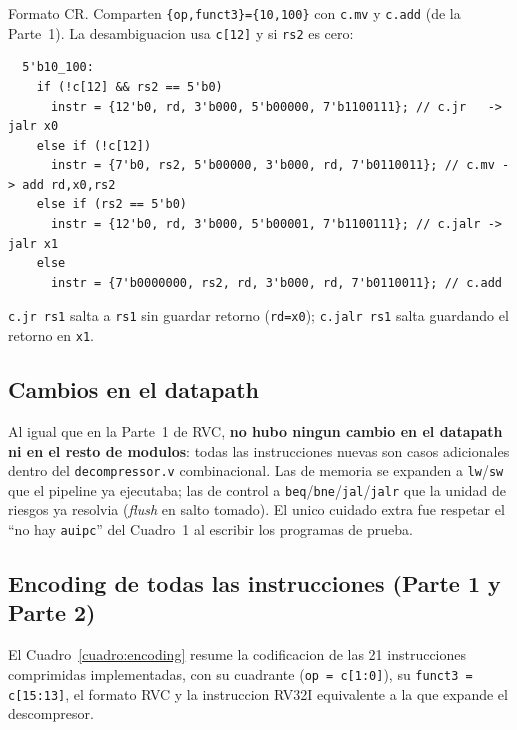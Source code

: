 \documentclass[11pt,a4paper]{article}
\begin{document}
Formato CR. Comparten \texttt{\{op,funct3\}=\{10,100\}} con \texttt{c.mv} y
\texttt{c.add} (de la Parte~1). La desambiguacion usa \texttt{c[12]} y si
\texttt{rs2} es cero:

\begin{lstlisting}
  5'b10_100:
    if (!c[12] && rs2 == 5'b0)
      instr = {12'b0, rd, 3'b000, 5'b00000, 7'b1100111}; // c.jr   -> jalr x0
    else if (!c[12])
      instr = {7'b0, rs2, 5'b00000, 3'b000, rd, 7'b0110011}; // c.mv -> add rd,x0,rs2
    else if (rs2 == 5'b0)
      instr = {12'b0, rd, 3'b000, 5'b00001, 7'b1100111}; // c.jalr -> jalr x1
    else
      instr = {7'b0000000, rs2, rd, 3'b000, rd, 7'b0110011}; // c.add
\end{lstlisting}

\texttt{c.jr rs1} salta a \texttt{rs1} sin guardar retorno (\texttt{rd=x0});
\texttt{c.jalr rs1} salta guardando el retorno en \texttt{x1}.

\subsection{Cambios en el datapath}

Al igual que en la Parte~1 de RVC, \textbf{no hubo ningun cambio en el
datapath ni en el resto de modulos}: todas las instrucciones nuevas son casos
adicionales dentro del \texttt{decompressor.v} combinacional. Las de memoria se
expanden a \texttt{lw}/\texttt{sw} que el pipeline ya ejecutaba; las de control
a \texttt{beq}/\texttt{bne}/\texttt{jal}/\texttt{jalr} que la unidad de riesgos
ya resolvia (\textit{flush} en salto tomado). El unico cuidado extra fue
respetar el ``no hay \texttt{auipc}'' del Cuadro~1 al escribir los programas de
prueba.

\subsection{Encoding de todas las instrucciones (Parte 1 y Parte 2)}

El Cuadro~\ref{cuadro:encoding} resume la codificacion de las 21 instrucciones
comprimidas implementadas, con su cuadrante (\texttt{op = c[1:0]}), su
\texttt{funct3 = c[15:13]}, el formato RVC y la instruccion RV32I equivalente a
la que expande el descompresor.
\end{document}
